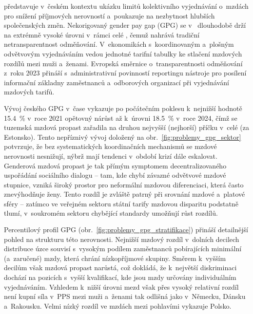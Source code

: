 představuje v~českém kontextu ukázku limitů kolektivního vyjednávání o~mzdách pro snížení příjmových nerovností a~poukazuje na nezbytnost hlubších společenských změn. Nekorigovaný gender pay gap (\ac{GPG}) se v~ dlouhodobě drží na extrémně vysoké úrovni v~rámci celé , čemuž nahrává tradiční netransparentnost odměňování. V~ekonomikách s~koordinovaným a~plošným odvětvovým vyjednáváním vedou jednotné tarifní tabulky ke stlačení mzdových rozdílů mezi muži a~ženami. Evropská směrnice o~transparentnosti odměňování z~roku 2023 přináší s~administrativní povinností reportingu nástroje pro posílení informační základny zaměstnanců a~odborových organizací při vyjednávání mzdových tarifů.\par


Vývoj českého \acs{GPG} v~čase vykazuje po počátečním poklesu k~nejnižší hodnotě \SI{15,4}{\percent} v~roce 2021 opětovný nárůst až k~úrovni \SI{18,5}{\percent} v~roce 2024, čímž se tuzemská mzdová propast zařadila na druhou nejvyšší (nejhorší) příčku v~celé  (za Estonsko). Tento nepříznivý vývoj doložený na obr.~\ref{fig:problemy_gpg_sektor} potvrzuje, že bez systematických koordinačních mechanismů se mzdové nerovnosti nesnižují, nýbrž mají tendenci v~období krizí dále eskalovat. Genderová mzdová propast je tak přímým symptomem decentralizovaného uspořádání sociálního dialogu -- tam, kde chybí závazné odvětvové mzdové stupnice, vzniká široký prostor pro neformální mzdovou diferenciaci, která často znevýhodňuje ženy. Tento rozdíl je zvláště patrný při srovnání mzdové a~platové sféry -- zatímco ve veřejném sektoru státní tarify mzdovou disparitu podstatně tlumí, v~soukromém sektoru chybějící standardy umožňují růst rozdílů.\par



Percentilový profil \acs{GPG} (obr.~\ref{fig:problemy_gpg_stratifikace}) přináší detailnější pohled na strukturu této nerovnosti. Nejnižší mzdový rozdíl v~dolních decilech distribuce úzce souvisí s~vysokým podílem zaměstnanců pobírajících minimální (a~zaručené) mzdy, která chrání nízkopříjmové skupiny. Směrem k~vyšším decilům však mzdová propast narůstá, což dokládá, že k~největší diskriminaci dochází na pozicích s~vyšší kvalifikací, kde jsou mzdy určovány individuálním vyjednáváním. Vzhledem k~nižší úrovni mezd však přes vysoký relativní rozdíl není kupní síla v~\acs{PPS} mezi muži a~ženami tak odlišná jako v~Německu, Dánsku a~Rakousku. Velmi nízký rozdíl ve mzdách mezi pohlavími vykazuje Polsko.\par

